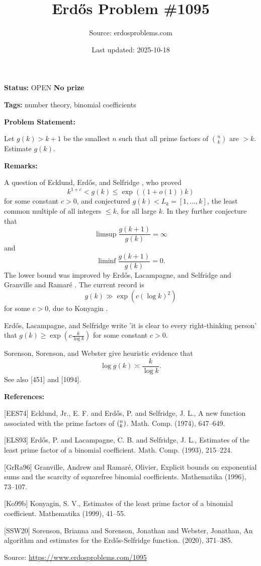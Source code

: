 \documentclass{article}
\title{Erd\H{o}s Problem \#1095}
\date{Last updated: 2025-10-18}
\author{Source: erdosproblems.com}
\begin{document}
\maketitle

\noindent\textbf{Status:} OPEN \quad \textbf{No prize}

\noindent\textbf{Tags:} number theory, binomial coefficients

\medskip
\noindent\textbf{Problem Statement:}

Let $g(k)>k+1$ be the smallest $n$ such that all prime factors of $\binom{n}{k}$ are $>k$. Estimate $g(k)$.

\bigskip
\noindent\textbf{Remarks:}

A question of Ecklund, Erd\H{o}s, and Selfridge \cite{EES74}, who proved\[k^{1+c}<g(k)\leq \exp((1+o(1))k)\]for some constant $c>0$, and conjectured $g(k)<L_k=[1,\ldots,k]$, the least common multiple of all integers $\leq k$, for all large $k$. In \cite{EES74} they further conjecture that\[\limsup \frac{g(k+1)}{g(k)}=\infty\]and\[\liminf \frac{g(k+1)}{g(k)}=0.\]The lower bound was improved by Erd\H{o}s, Lacampagne, and Selfridge \cite{ELS93} and Granville and Ramar\'{e} \cite{GrRa96}. The current record is\[g(k) \gg \exp(c(\log k)^2)\]for some $c>0$, due to Konyagin \cite{Ko99b}.

Erd\H{o}s, Lacampagne, and Selfridge \cite{ELS93} write 'it is clear to every right-thinking person' that $g(k)\geq\exp(c\frac{k}{\log k})$ for some constant $c>0$.

Sorenson, Sorenson, and Webster \cite{SSW20} give heuristic evidence that\[\log g(k) \asymp \frac{k}{\log k}.\]See also [451] and [1094].

\bigskip
\noindent\textbf{References:}

[EES74] Ecklund, Jr., E. F. and Erd\H{o}s, P. and Selfridge, J. L., A new function associated with the prime factors of
{$(\sp{n}\sb{k})$}. Math. Comp. (1974), 647--649.
 
 [ELS93] Erd\H{o}s, P. and Lacampagne, C. B. and Selfridge, J. L., Estimates of the least prime factor of a binomial coefficient. Math. Comp. (1993), 215--224.
 
 [GrRa96] Granville, Andrew and Ramar\'{e}, Olivier, Explicit bounds on exponential sums and the scarcity of
squarefree binomial coefficients. Mathematika (1996), 73--107.
 
 [Ko99b] Konyagin, S. V., Estimates of the least prime factor of a binomial coefficient. Mathematika (1999), 41--55.
 
 [SSW20] Sorenson, Brianna and Sorenson, Jonathan and Webster,
Jonathan, An algorithm and estimates for the {E}rd\H{o}s-Selfridge
function. (2020), 371--385.

\bigskip
\noindent\small{Source: \url{https://www.erdosproblems.com/1095}}
\end{document}
